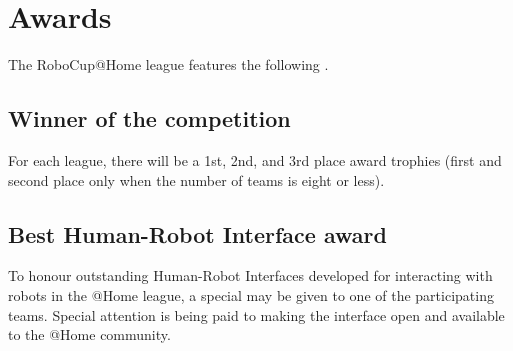 \section{Awards}
\label{sec:awards}
The RoboCup@Home league features the following .

\subsection{Winner of the competition}
\label{award:winner}
For each league, there will be a 1st, 2nd, and 3rd place award trophies (first and second place only when the number of teams is eight or less).

%
%
% 
% 


%
%
\subsection{Best Human-Robot Interface award}
\label{award:hri}
To honour outstanding Human-Robot Interfaces developed for interacting with robots in the @Home league, a special  may be given to one of the participating teams. Special attention is being paid to making the interface open and available to the @Home community.

